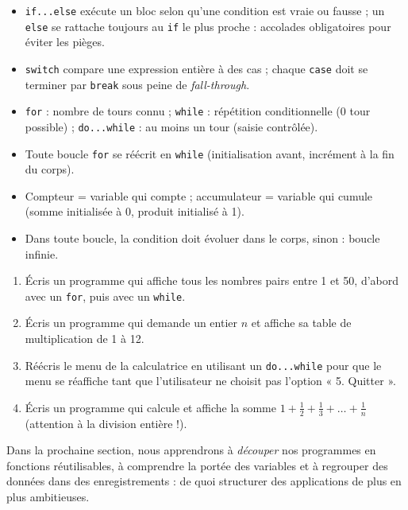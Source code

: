 \documentclass[11pt]{article}
\begin{document}
\begin{aretenir}
\begin{itemize}
    \item \texttt{if...else} exécute un bloc selon qu'une condition est vraie ou fausse ; un \texttt{else} se rattache toujours au \texttt{if} le plus proche : accolades obligatoires pour éviter les pièges.
    \item \texttt{switch} compare une expression entière à des cas ; chaque \texttt{case} doit se terminer par \texttt{break} sous peine de \emph{fall-through}.
    \item \texttt{for} : nombre de tours connu ; \texttt{while} : répétition conditionnelle (0 tour possible) ; \texttt{do...while} : au moins un tour (saisie contrôlée).
    \item Toute boucle \texttt{for} se réécrit en \texttt{while} (initialisation avant, incrément à la fin du corps).
    \item Compteur = variable qui compte ; accumulateur = variable qui cumule (somme initialisée à 0, produit initialisé à 1).
    \item Dans toute boucle, la condition doit évoluer dans le corps, sinon : boucle infinie.
\end{itemize}
\end{aretenir}

\begin{exercice}
\begin{enumerate}
    \item Écris un programme qui affiche tous les nombres pairs entre 1 et 50, d'abord avec un \texttt{for}, puis avec un \texttt{while}.
    \item Écris un programme qui demande un entier $n$ et affiche sa table de multiplication de 1 à 12.
    \item Réécris le menu de la calculatrice en utilisant un \texttt{do...while} pour que le menu se réaffiche tant que l'utilisateur ne choisit pas l'option « 5. Quitter ».
    \item Écris un programme qui calcule et affiche la somme $1 + \frac{1}{2} + \frac{1}{3} + \dots + \frac{1}{n}$ (attention à la division entière !).
\end{enumerate}
\end{exercice}

Dans la prochaine section, nous apprendrons à \emph{découper} nos programmes en fonctions réutilisables, à comprendre la portée des variables et à regrouper des données dans des enregistrements : de quoi structurer des applications de plus en plus ambitieuses.
\end{document}
